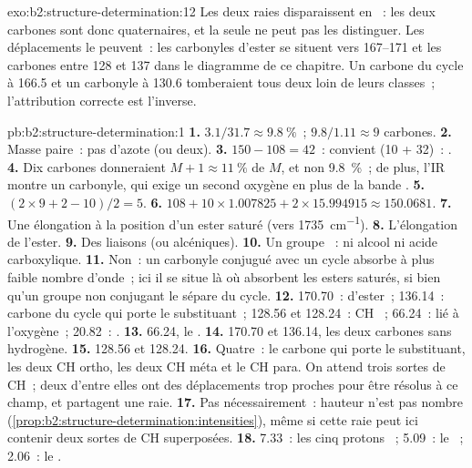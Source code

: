 \begin{solution}{exo:b2:structure-determination:12}
Les deux raies disparaissent en ~: les deux carbones sont donc quaternaires, et la  seule ne peut
pas les distinguer. Les déplacements le peuvent~: les carbonyles d'ester se situent vers 167--171 et les
carbones  entre 128 et 137 dans le diagramme de ce chapitre. Un carbone du cycle à 166.5 et un
carbonyle à 130.6 tomberaient tous deux loin de leurs classes~; l'attribution correcte est l'inverse.
\end{solution}

\begin{solution}{pb:b2:structure-determination:1}
\textbf{1.} $3.1/31.7 \approx 9.8~\%$~; $9.8/1.11 \approx 9$ carbones.
\textbf{2.} Masse paire~: pas d'azote (ou deux).
\textbf{3.} $150 - 108 = 42$~:  convient (10 + 32)~: .
\textbf{4.} Dix carbones donneraient $M+1 \approx 11~\%$ de $M$, et non 9.8~\%~; de plus, l'IR montre un
carbonyle, qui exige un second oxygène en plus de la bande .
\textbf{5.} $(2 \times 9 + 2 - 10)/2 = 5$.
\textbf{6.} $108 + 10 \times 1.007825 + 2 \times 15.994915 \approx 150.0681$.
\textbf{7.} Une élongation  à la position d'un ester saturé (vers \qty{1735}{cm^{-1}}).
\textbf{8.} L'élongation  de l'ester.
\textbf{9.} Des liaisons   (ou alcéniques).
\textbf{10.} Un groupe ~: ni alcool ni acide carboxylique.
\textbf{11.} Non~: un carbonyle conjugué avec un cycle absorbe à plus faible nombre d'onde~; ici il se situe
là où absorbent les esters saturés, si bien qu'un groupe non conjugant le sépare du cycle.
\textbf{12.} 170.70~:  d'ester~; 136.14~: carbone du cycle qui porte le substituant~; 128.56 et
128.24~: CH ~; 66.24~:  lié à l'oxygène~; 20.82~: .
\textbf{13.} 66.24, le .
\textbf{14.} 170.70 et 136.14, les deux carbones sans hydrogène.
\textbf{15.} 128.56 et 128.24.
\textbf{16.} Quatre~: le carbone qui porte le substituant, les deux CH ortho, les deux CH méta et le CH para.
On attend trois sortes de CH~; deux d'entre elles ont des déplacements trop proches pour être résolus à ce
champ, et partagent une raie.
\textbf{17.} Pas nécessairement~: hauteur n'est pas nombre (\cref{prop:b2:structure-determination:intensities}),
même si cette raie peut ici contenir deux sortes de CH superposées.
\textbf{18.} 7.33~: les cinq protons ~; 5.09~: le ~; 2.06~: le .

\end{solution}
